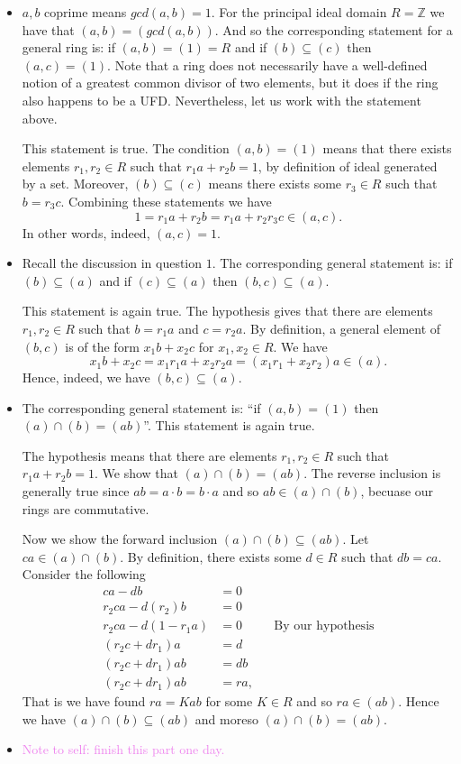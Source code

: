 \documentclass[12pt,letterpaper,boxed]{hmcpset}
\newcommand{\wg}[1]{\textcolor{violet}{#1}}
\newcommand{\Z}{\mathbb Z}
\begin{document}
\begin{solution}
\begin{itemize}
\item $a,b$ coprime means $gcd(a,b) = 1$. For the principal ideal
domain $R = \Z$ we have that $(a,b) = (gcd(a,b))$. And so the
corresponding statement for a general ring is:
if $(a,b) = (1) = R$ and if $(b) \subseteq (c)$ then $(a,c) = (1)$. 
Note that a ring does not necessarily have a well-defined notion of a
greatest common divisor of two elements, but it does if the ring also
happens to be a UFD. Nevertheless, let us work with the statement
above.

This statement is true. The condition $(a,b) = (1)$ means that there
exists elements $r_1, r_2 \in R$ such that $r_1a + r_2b = 1$, by
definition of ideal generated by a set. Moreover, $(b) \subseteq (c)$
means there exists some $r_3 \in R$ such that $b = r_3 c$. Combining
these statements we have \[
	1 = r_1a + r_2 b = r_1 a + r_2r_3 c \in (a,c). 
\]
In other words, indeed, $(a,c) = 1$. 

\item Recall the discussion in question $1$. The corresponding general
statement is: if $(b) \subseteq (a)$ and if $(c) \subseteq (a)$ then
$(b,c) \subseteq (a)$. 

This statement is again true. The hypothesis gives that there are
elements $r_1, r_2 \in R$ such that $b = r_1a$ and $c = r_2 a$. By
definition, a general element of $(b,c)$ is of the form $x_1 b + x_2
c$ for $x_1, x_2 \in R$. We have
\[
	x_1 b + x_2 c = x_1r_1 a + x_2r_2 a = (x_1 r_1 + x_2r_2) a \in (a). 
\]
Hence, indeed, we have $(b,c) \subseteq (a)$. 

\item The corresponding general statement is: ``if $(a,b) = (1)$ then
$(a) \cap (b) = (ab)$''. This statement is again true.

The hypothesis means that there are elements $r_1, r_2 \in R$ such
that $r_1 a + r_2 b = 1$. We show that $(a) \cap (b) = (ab)$. The
reverse inclusion is generally true since $ab = a \cdot b = b \cdot a$
and so $ab \in (a) \cap (b)$, becuase our rings are commutative.

Now we show the forward inclusion $(a) \cap (b) \subseteq (ab)$. Let
$ca \in (a) \cap (b)$. By definition, there exists some $d \in R$ such
that $db = ca$. Consider the following
\begin{align*}
	ca - db &= 0 \\
	r_2ca - d(r_2)b &= 0 \\
	r_2ca - d(1 - r_1a) &= 0 && \text{By our hypothesis} \\
	(r_2c + dr_1)a &= d \\
	(r_2c + dr_1)ab &= db \\
	(r_2c + dr_1)ab &= ra,
\end{align*}
That is we have found $ra = Kab$ for some $K \in R$ and so $ra \in
(ab)$. Hence we have $(a) \cap (b) \subseteq (ab)$ and moreso $(a)
\cap (b) = (ab)$.

\item \wg{Note to self: finish this part one day.}

\end{itemize}
\end{solution}
\end{document}
